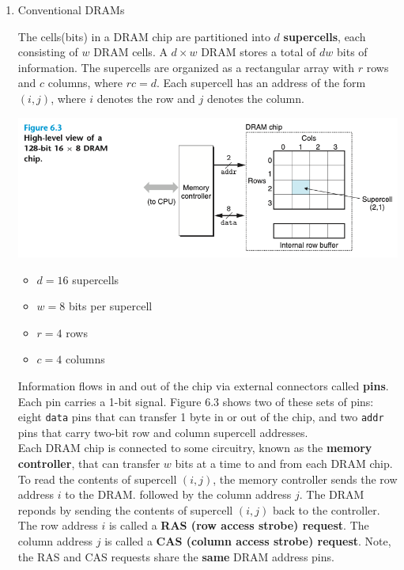 \documentclass[11pt]{article}
\begin{document}
\begin{enumerate}
\item Conventional DRAMs
\label{sec:org4f83260}

The cells(bits) in a DRAM chip are partitioned into \(d\) \textbf{supercells}, each consisting of \(w\) DRAM cells. A \(d \times w\) DRAM stores a total of \(dw\) bits of information. The supercells are organized as a rectangular array with \(r\) rows and \(c\) columns, where \(rc = d\). Each supercell has an address of the form \((i,j)\), where \(i\) denotes the row and \(j\) denotes the column.\\


\begin{center}
\includegraphics[width=.9\linewidth]{pics/figure6.3-high-level-view-of-a-128-bit-16x8-dram-chip.png}
\end{center}

\begin{itemize}
\item \(d = 16\) supercells\\
\item \(w=8\) bits per supercell\\
\item \(r=4\) rows\\
\item \(c=4\) columns\\
\end{itemize}

Information flows in and out of the chip via external connectors called \textbf{pins}. Each pin carries a 1-bit signal. Figure 6.3 shows two of these sets of pins: eight \texttt{data} pins that can transfer 1 byte in or out of the chip, and two \texttt{addr} pins that carry two-bit row and column supercell addresses.\\

Each DRAM chip is connected to some circuitry, known as the \textbf{memory controller}, that can transfer \(w\) bits at a time to and from each DRAM chip. To read the contents of supercell \((i,j)\), the memory controller sends the row address \(i\) to the DRAM. followed by the column address \(j\). The DRAM reponds by sending the contents of supercell \((i,j)\) back to the controller. The row address \(i\) is called a \textbf{RAS (row access strobe) request}. The column address \(j\) is called a \textbf{CAS (column access strobe) request}. Note, the RAS and CAS requests share the \textbf{same} DRAM address pins.\\



\end{enumerate}
\end{document}
